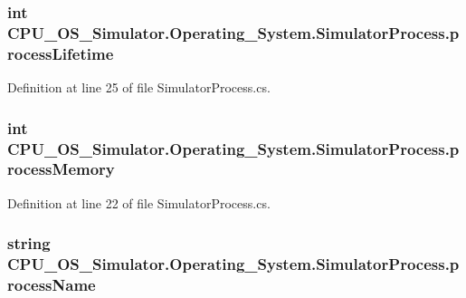 \subsubsection[{process\+Lifetime}]{\setlength{\rightskip}{0pt plus 5cm}int C\+P\+U\+\_\+\+O\+S\+\_\+\+Simulator.\+Operating\+\_\+\+System.\+Simulator\+Process.\+process\+Lifetime\hspace{0.3cm}{\ttfamily [private]}}\label{class_c_p_u___o_s___simulator_1_1_operating___system_1_1_simulator_process_aa70f97b2b63f49ded3d505d104a1f3d9}


Definition at line 25 of file Simulator\+Process.\+cs.

\hypertarget{class_c_p_u___o_s___simulator_1_1_operating___system_1_1_simulator_process_af574b021e490c03ed55332ee0ed4c067}{}
\subsubsection[{process\+Memory}]{\setlength{\rightskip}{0pt plus 5cm}int C\+P\+U\+\_\+\+O\+S\+\_\+\+Simulator.\+Operating\+\_\+\+System.\+Simulator\+Process.\+process\+Memory\hspace{0.3cm}{\ttfamily [private]}}\label{class_c_p_u___o_s___simulator_1_1_operating___system_1_1_simulator_process_af574b021e490c03ed55332ee0ed4c067}


Definition at line 22 of file Simulator\+Process.\+cs.

\hypertarget{class_c_p_u___o_s___simulator_1_1_operating___system_1_1_simulator_process_a6d29b67977f07ebb1b6336b96960752b}{}
\subsubsection[{process\+Name}]{\setlength{\rightskip}{0pt plus 5cm}string C\+P\+U\+\_\+\+O\+S\+\_\+\+Simulator.\+Operating\+\_\+\+System.\+Simulator\+Process.\+process\+Name\hspace{0.3cm}{\ttfamily [private]}}\label{class_c_p_u___o_s___simulator_1_1_operating___system_1_1_simulator_process_a6d29b67977f07ebb1b6336b96960752b}


